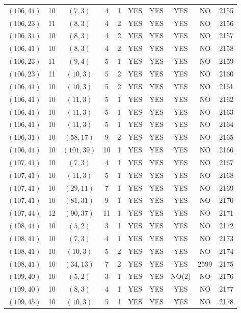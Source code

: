 \begin{longtable}{|c|c|c|c|c|c|c|c|c|c|}
$(106, 41)$ & 10 & $(7, 3)$ & 4 & 1 & YES & YES & YES & NO & 2155\\
$(106, 23)$ & 11 & $(8, 3)$ & 4 & 2 & YES & YES & YES & NO & 2156\\
$(106, 31)$ & 10 & $(8, 3)$ & 4 & 2 & YES & YES & YES & NO & 2157\\
$(106, 41)$ & 10 & $(8, 3)$ & 4 & 2 & YES & YES & YES & NO & 2158\\
$(106, 23)$ & 11 & $(9, 4)$ & 5 & 1 & YES & YES & YES & NO & 2159\\
$(106, 23)$ & 11 & $(10, 3)$ & 5 & 2 & YES & YES & YES & NO & 2160\\
$(106, 41)$ & 10 & $(10, 3)$ & 5 & 2 & YES & YES & YES & NO & 2161\\
$(106, 41)$ & 10 & $(11, 3)$ & 5 & 1 & YES & YES & YES & NO & 2162\\
$(106, 41)$ & 10 & $(11, 3)$ & 5 & 1 & YES & YES & YES & NO & 2163\\
$(106, 41)$ & 10 & $(11, 3)$ & 5 & 1 & YES & YES & YES & NO & 2164\\
$(106, 31)$ & 10 & $(58, 17)$ & 9 & 2 & YES & YES & YES & NO & 2165\\
$(106, 41)$ & 10 & $(101, 39)$ & 10 & 1 & YES & YES & YES & NO & 2166\\
$(107, 41)$ & 10 & $(7, 3)$ & 4 & 1 & YES & YES & YES & NO & 2167\\
$(107, 41)$ & 10 & $(11, 3)$ & 5 & 1 & YES & YES & YES & NO & 2168\\
$(107, 41)$ & 10 & $(29, 11)$ & 7 & 1 & YES & YES & YES & NO & 2169\\
$(107, 41)$ & 10 & $(81, 31)$ & 9 & 1 & YES & YES & YES & NO & 2170\\
$(107, 44)$ & 12 & $(90, 37)$ & 11 & 1 & YES & YES & YES & NO & 2171\\
$(108, 41)$ & 10 & $(5, 2)$ & 3 & 1 & YES & YES & YES & NO & 2172\\
$(108, 41)$ & 10 & $(7, 3)$ & 4 & 1 & YES & YES & YES & NO & 2173\\
$(108, 41)$ & 10 & $(10, 3)$ & 5 & 2 & YES & YES & YES & NO & 2174\\
$(108, 41)$ & 10 & $(34, 13)$ & 7 & 2 & YES & YES & YES & 2599 & 2175\\
$(109, 40)$ & 10 & $(5, 2)$ & 3 & 1 & YES & YES & NO(2) & NO & 2176\\
$(109, 40)$ & 10 & $(8, 3)$ & 4 & 1 & YES & YES & YES & NO & 2177\\
$(109, 45)$ & 10 & $(10, 3)$ & 5 & 1 & YES & YES & YES & NO & 2178\\

\end{longtable}
